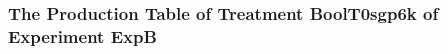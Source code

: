 \begin{frame}
 \fontsize{8pt}{9pt}\selectfont
 \frametitle{ The Production Table of Treatment BoolT0sgp6k of Experiment ExpB }

 \label{ExpBGrammarTable004.tex}  
 \end{frame}

